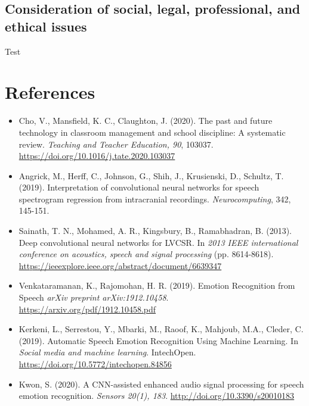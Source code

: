 \documentclass[12pt]{article}
\begin{document}
\subsection{Consideration of social, legal, professional, and ethical issues}
Test
\newpage

\section{References}

\begin{itemize}
\item Cho, V., Mansfield, K. C., Claughton, J. (2020). The past and future technology in classroom management and school discipline: A systematic review. \textit{Teaching and Teacher Education, 90}, 103037. \href{https://doi.org/10.1016/j.tate.2020.103037}{https://doi.org/10.1016/j.tate.2020.103037}

\item Angrick, M., Herff, C., Johnson, G., Shih, J., Krusienski, D., Schultz, T. (2019). Interpretation of convolutional neural networks for speech spectrogram regression from intracranial recordings. \textit{Neurocomputing}, 342, 145-151.

\item Sainath, T. N., Mohamed, A. R., Kingsbury, B., Ramabhadran, B. (2013). Deep convolutional neural networks for LVCSR. In \textit{2013 IEEE international conference on acoustics, speech and signal processing} (pp. 8614-8618). \tab \href{https://ieeexplore.ieee.org/abstract/document/6639347}{https://ieeexplore.ieee.org/abstract/document/6639347}

\item Venkataramanan, K., Rajomohan, H. R. (2019). Emotion Recognition from Speech \textit{arXiv preprint arXiv:1912.10458}. \href{https://arxiv.org/pdf/1912.10458.pdf}{https://arxiv.org/pdf/1912.10458.pdf}

\item Kerkeni, L., Serrestou, Y., Mbarki, M., Raoof, K., Mahjoub, M.A., Cleder, C. (2019). Automatic Speech Emotion Recognition Using Machine Learning. In \textit{Social media and machine learning}. IntechOpen. \href{https://doi.org/10.5772/intechopen.84856}{https://doi.org/10.5772/intechopen.84856}

\item Kwon, S. (2020). A CNN-assisted enhanced audio signal processing for speech emotion recognition. \textit{Sensors 20(1), 183}. \href{http://doi.org/10.3390/s20010183}{http://doi.org/10.3390/s20010183}


\end{itemize}
\end{document}
